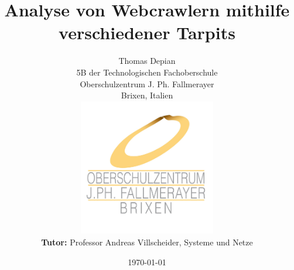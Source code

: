 \title{Analyse von Webcrawlern mithilfe verschiedener Tarpits}
\author{
  Thomas Depian\\
  5B der Technologischen Fachoberschule\\
  Oberschulzentrum J. Ph. Fallmerayer\\
  Brixen, Italien\\
  \includegraphics[width=6cm]{img/logo}
  \\
  \textbf{Tutor:} Professor Andreas Villscheider, Systeme und Netze\\
}
\date{\today}
\maketitle